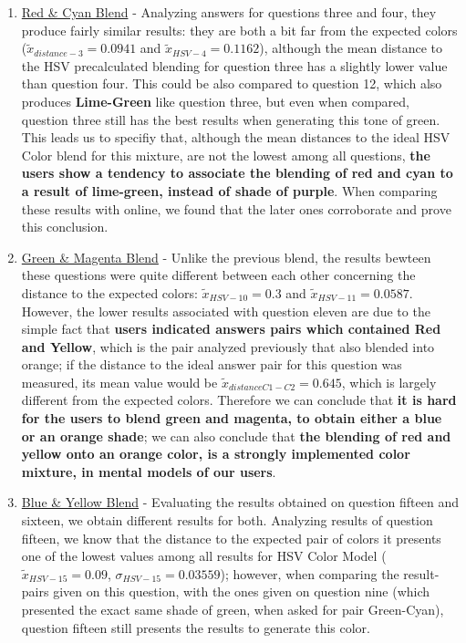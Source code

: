 \begin{enumerate}
  \item \ul{Red \& Cyan Blend} - Analyzing answers for questions three and four, they produce fairly similar results: they are both a bit far from the expected colors ($\tilde{x}_{distance-3} = 0.0941$ and
  $\tilde{x}_{HSV-4} = 0.1162$), although the mean distance to the HSV precalculated blending for question three has a slightly lower value than question four. This could be also compared to question 12, which also
  produces \textbf{Lime-Green} like question three, but even when compared, question three still has the best results when generating this tone of green. This leads us to specifiy that, although the mean distances to the
  ideal HSV Color blend for this mixture, are not the lowest among all questions, \textbf{the users show a tendency to associate the blending of red and cyan to a result of lime-green, instead of shade of purple}. When comparing
  these results with online, we found that the later ones corroborate and prove this conclusion.
  \item \ul{Green \& Magenta Blend} - Unlike the previous blend, the results bewteen these questions were quite different between each other concerning the distance to the expected colors: $\tilde{x}_{HSV-10} = 0.3$
  and $\tilde{x}_{HSV-11} = 0.0587$. However, the lower results associated with question eleven are due to the simple fact that \textbf{users indicated answers pairs which contained Red and Yellow}, which is the pair
  analyzed previously that also blended into orange; if the distance to the ideal answer pair for this question was measured, its mean value would be $\tilde{x}_{distanceC1-C2} = 0.645$, which is largely different from the
  expected colors. Therefore we can conclude that \textbf{it is hard for the users to blend green and magenta, to obtain either a blue or an orange shade}; we can also conclude that \textbf{the blending of red and yellow
  onto an orange color, is a strongly implemented color mixture, in mental models of our users}.
  \item \ul{Blue \& Yellow Blend} - Evaluating the results obtained on question fifteen and sixteen, we obtain different results for both. Analyzing results of question fifteen, we know that the distance to the expected
  pair of colors it presents one of the lowest values among all results for HSV Color Model ($\tilde{x}_{HSV-15} = 0.09$, $\sigma_{HSV-15} = 0.03559$); however, when comparing the result-pairs given on this question, with
  the ones given on question nine (which presented the exact same shade of green, when asked for pair Green-Cyan), question fifteen still presents the results to generate this color.

\end{enumerate}
